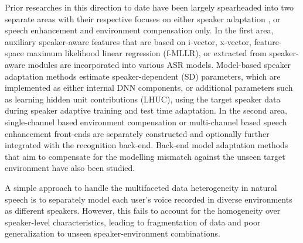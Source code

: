 \documentclass{INTERSPEECH2023}
\begin{document}
Prior researches in this direction to date have been largely spearheaded into two separate areas with their respective focuses on either speaker adaptation \cite{bell2020adaptation}, or speech enhancement and environment compensation only\cite{li2014overview}. In the first area, auxiliary speaker-aware features that are based on i-vector\cite{karafiat2011ivector,tuske2021limit,zeineldeen2022improving}, x-vector\cite{zeineldeen2022improving,baskar2022speaker}, feature-space maximum likelihood linear regression (f-MLLR)\cite{gales1998maximum,baskar2022speaker}, or extracted from speaker-aware modules\cite{delcroix2018auxiliary,zhao2020speech,sari2020unsupervised} are incorporated into various ASR models. Model-based speaker adaptation methods estimate speaker-dependent (SD) parameters, which are implemented as either internal DNN components\cite{ochiai2018speaker,huang2021rapid}, or additional parameters such as learning hidden unit contributions (LHUC)\cite{Swietojanski2016LearningHU,Xie2021BayesianLF,deng2023confidence}, using the target speaker data during speaker adaptive training and test time adaptation\cite{anastasakos1996compact,ochiai2014speaker}. In the second area, single-channel based environment compensation \cite{moreno1996vector,stouten2006model,yu2008minimum,yoshioka2015environmentally,ravanelli2020multi} or multi-channel based speech enhancement front-ends\cite{seltzer2004likelihood,anguera2007acoustic,xu2019joint,heymann2019joint,yu2021audio,zhang2021end} are separately constructed and optionally further integrated with the recognition back-end. Back-end model adaptation methods that aim to compensate for the modelling mismatch against the unseen target environment have also been studied\cite{seltzer2010acoustic,chen2014initial}.

A simple approach to handle the multifaceted data heterogeneity in natural speech is to separately model each user’s voice recorded in diverse environments as different speakers. However, this fails to account for the homogeneity over speaker-level characteristics, leading to fragmentation of data and poor generalization to unseen speaker-environment combinations. 
\end{document}
